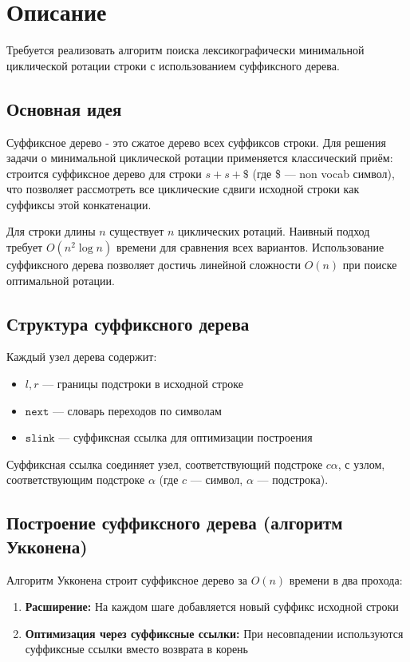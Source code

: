 \section{Описание}

Требуется реализовать алгоритм поиска лексикографически минимальной циклической ротации строки с использованием суффиксного дерева.

\subsection{Основная идея}

Суффиксное дерево - это сжатое дерево всех суффиксов строки. Для решения задачи о минимальной циклической ротации применяется классический приём: строится суффиксное дерево для строки $s + s + \$$ (где \$ --- non vocab символ), что позволяет рассмотреть все циклические сдвиги исходной строки как суффиксы этой конкатенации.

Для строки длины $n$ существует $n$ циклических ротаций. Наивный подход требует $O(n^2 \log n)$ времени для сравнения всех вариантов. Использование суффиксного дерева позволяет достичь линейной сложности $O(n)$ при поиске оптимальной ротации.

\subsection{Структура суффиксного дерева}

Каждый узел дерева содержит:
\begin{itemize}
    \item $l, r$ --- границы подстроки в исходной строке
    \item $\mathtt{next}$ --- словарь переходов по символам
    \item $\mathtt{slink}$ --- суффиксная ссылка для оптимизации построения
\end{itemize}

Суффиксная ссылка соединяет узел, соответствующий подстроке $c \alpha$, с узлом, соответствующим подстроке $\alpha$ (где $c$ --- символ, $\alpha$ --- подстрока).

\subsection{Построение суффиксного дерева (алгоритм Укконена)}

Алгоритм Укконена строит суффиксное дерево за $O(n)$ времени в два прохода:

\begin{enumerate}
    \item \textbf{Расширение:} На каждом шаге добавляется новый суффикс исходной строки
    \item \textbf{Оптимизация через суффиксные ссылки:} При несовпадении используются суффиксные ссылки вместо возврата в корень
\end{enumerate}

